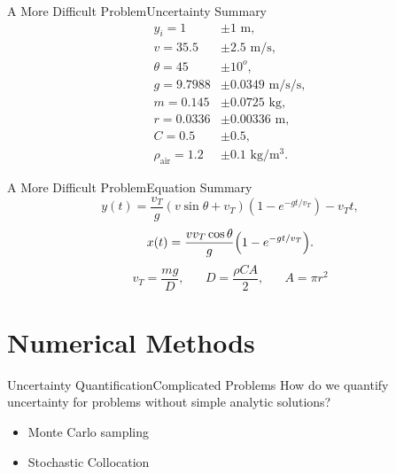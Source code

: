 \documentclass{beamer}
\begin{document}
\begin{frame}[label=unc_sum]{A More Difficult Problem}{Uncertainty Summary}\vspace{-30pt}
\begin{align*}
y_i=1&\pm1\text{ m},\\
v=35.5&\pm2.5\text{ m/s},\\
\theta=45&\pm10^o,\\
g=9.7988&\pm0.0349\text{ m/s/s},\\
m=0.145&\pm0.0725\text{ kg},\\
r=0.0336&\pm0.00336\text{ m},\\
C=0.5&\pm0.5,\\
\rho_\text{air}=1.2&\pm0.1\text{ kg/m$^3$}.
\end{align*}
\begin{center}\hyperlink{sens_use}{}\end{center}\vspace{-20pt}
\begin{center}\hyperlink{sens_res}{}\end{center}
\end{frame}

\begin{frame}{A More Difficult Problem}{Equation Summary}
\begin{equation*}
y(t)=\frac{v_T}{g}(v\sin\theta+v_T)\left(1-e^{-gt/v_T}\right)-v_Tt,
\end{equation*}\vspace{15pt}
\begin{equation*}
x(t)=\frac{vv_T\cos\theta}{g}\qty(1-e^{-gt/v_T}).
\end{equation*}\vspace{15pt}
\begin{equation*}
v_T=\frac{mg}{D},\hspace{20pt}D=\frac{\rho C A}{2},\hspace{20pt}A=\pi r^2
\end{equation*}
\end{frame}

\section{Numerical Methods}
\begin{frame}{Uncertainty Quantification}{Complicated Problems}\vspace{-20pt}
How do we quantify uncertainty for problems without simple analytic solutions?\vspace{15pt}
\begin{itemize}
\item Monte Carlo sampling
\item Stochastic Collocation
\end{itemize}
\end{frame}
\end{document}
